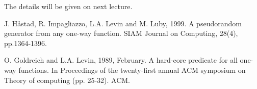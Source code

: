 \documentclass[12pt]{article}
\theoremstyle{definition}
\begin{document}
The details will be given on next lecture.

\begin{thebibliography}{10}
J. H\aa stad, R. Impagliazzo, L.A. Levin and M. Luby, 1999. 
A pseudorandom generator from any one-way function. 
SIAM Journal on Computing, 28(4), pp.1364-1396.
	
O. Goldreich and L.A. Levin, 1989, February. 
A hard-core predicate for all one-way functions. 
In Proceedings of the twenty-first annual ACM symposium on Theory of computing (pp. 25-32). ACM.
\end{thebibliography}
\end{document}
